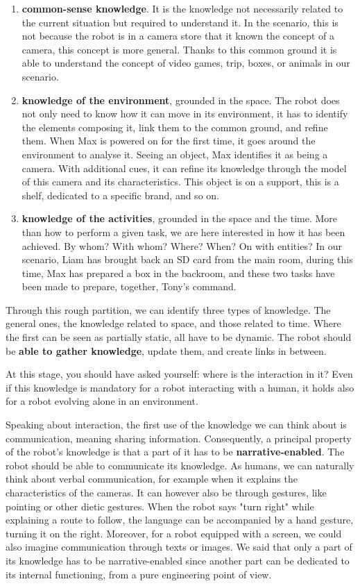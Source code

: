 \begin{enumerate}
  \item \textbf{common-sense knowledge}. It is the knowledge not necessarily related to the current situation but required to understand it. In the scenario, this is not because the robot is in a camera store that it known the concept of a camera, this concept is more general. Thanks to this common ground it is able to understand the concept of video games, trip, boxes, or animals in our scenario.
  \item \textbf{knowledge of the environment}, grounded in the space. The robot does not only need to know how it can move in its environment, it has to identify the elements composing it, link them to the common ground, and refine them. When Max is powered on for the first time, it goes around the environment to analyse it. Seeing an object, Max identifies it as being a camera. With additional cues, it can refine its knowledge through the model of this camera and its characteristics. This object is on a support, this is a shelf, dedicated to a specific brand, and so on.
  \item \textbf{knowledge of the activities}, grounded in the space and the time. More than how to perform a given task, we are here interested in how it has been achieved. By whom? With whom? Where? When? On with entities? In our scenario, Liam has brought back an SD card from the main room, during this time, Max has prepared a box in the backroom, and these two tasks have been made to prepare, together, Tony's command.
\end{enumerate}

Through this rough partition, we can identify three types of knowledge. The general ones, the knowledge related to space, and those related to time. Where the first can be seen as partially static, all have to be dynamic. The robot should be \textbf{able to gather knowledge}, update them, and create links in between.

At this stage, you should have asked yourself: where is the interaction in it? Even if this knowledge is mandatory for a robot interacting with a human, it holds also for a robot evolving alone in an environment.

Speaking about interaction, the first use of the knowledge we can think about is communication, meaning sharing information. Consequently, a principal property of the robot's knowledge is that a part of it has to be \textbf{narrative-enabled}. The robot should be able to communicate its knowledge. As humans, we can naturally think about verbal communication, for example when it explains the characteristics of the cameras. It can however also be through gestures, like pointing or other dietic gestures. When the robot says "turn right" while explaining a route to follow, the language can be accompanied by a hand gesture, turning it on the right. Moreover, for a robot equipped with a screen, we could also imagine communication through texts or images. We said that only a part of its knowledge has to be narrative-enabled since another part can be dedicated to its internal functioning, from a pure engineering point of view.

